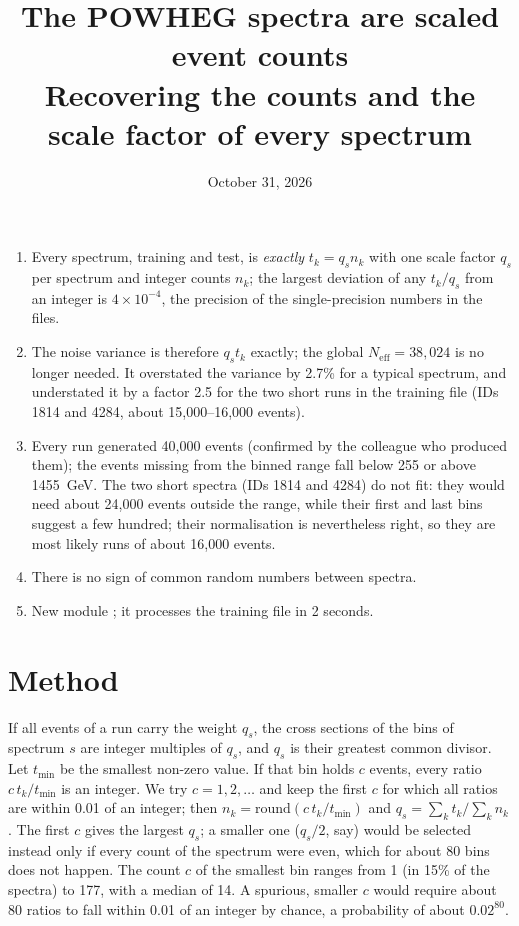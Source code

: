 
\title{\textbf{The POWHEG spectra are scaled event counts}\\[4pt]
\large Recovering the counts and the scale factor of every spectrum}
\date{October 31, 2026}

\maketitle

\begin{keyidea}[Summary]
\begin{enumerate}
  \item Every spectrum, training and test, is \emph{exactly} $t_k = q_s n_k$ with one scale
    factor $q_s$ per spectrum and integer counts $n_k$; the largest deviation of any
    $t_k/q_s$ from an integer is $4\times10^{-4}$, the precision of the single-precision
    numbers in the files.
  \item The noise variance is therefore $q_s t_k$ exactly; the global
    $N_\text{eff} = 38{,}024$ is no longer needed. It overstated the variance by 2.7\% for
    a typical spectrum, and understated it by a factor 2.5 for the two short runs in the
    training file (IDs 1814 and 4284, about 15,000--16,000 events).
  \item Every run generated 40,000 events (confirmed by the colleague who produced them);
    the events missing from the binned range fall below 255 or above 1455~GeV. The two
    short spectra (IDs 1814 and 4284) do not fit: they would need about 24,000 events
    outside the range, while their first and last bins suggest a few hundred; their
    normalisation is nevertheless right, so they are most likely runs of about 16,000
    events.
  \item There is no sign of common random numbers between spectra.
  \item New module ; it processes the training file in 2 seconds.
\end{enumerate}
\end{keyidea}

\section{Method}

If all events of a run carry the weight $q_s$, the cross sections of the bins of
spectrum $s$ are integer multiples of $q_s$, and $q_s$ is their greatest common divisor.
Let $t_\text{min}$ be the smallest non-zero value. If that bin holds $c$ events, every
ratio $c\,t_k/t_\text{min}$ is an integer. We try $c = 1, 2, \ldots$ and keep the first $c$
for which all ratios are within 0.01 of an integer; then $n_k = \mathrm{round}(c\,t_k /
t_\text{min})$ and $q_s = \sum_k t_k / \sum_k n_k$. The first $c$ gives the largest $q_s$;
a smaller one ($q_s/2$, say) would be selected instead only if every count of the spectrum
were even, which for about 80 bins does not happen. The count $c$ of the smallest bin ranges
from 1 (in 15\% of the spectra) to 177, with a median of 14. A spurious, smaller $c$ would
require about 80 ratios to fall within 0.01 of an integer by chance, a probability of
about $0.02^{80}$.

